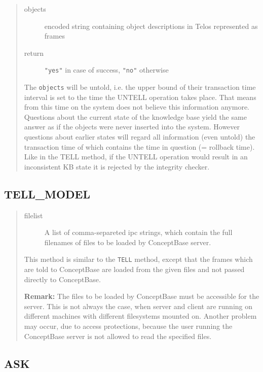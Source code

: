 \begin{quote}
\begin{description}
\item[objects] encoded string containing object descriptions in Telos represented as frames
\item[return] \verb+"yes"+ in case of success, \verb+"no"+ otherwise
\end{description}

The {\tt objects} will be untold, i.e. the upper bound of their
transaction time interval is set to the time the UNTELL operation
takes place. That means from this time on the system does not believe
this information anymore. Questions about the current state of the
knowledge base yield the same answer as if the objects were never
inserted into the system. However questions about earlier states will
regard all information (even untold) the transaction time of which
contains the time in question (= rollback time). Like in the TELL
method, if the UNTELL operation would result in an inconsistent KB
state it is rejected by the integrity checker.
\end{quote}

\subsection{TELL\_MODEL}


\begin{quote}
\begin{description}
\item[filelist] A list of comma-separeted ipc strings, which contain the full filenames of
files to be loaded by ConceptBase server.
\end{description}

This method is similar to the {\tt TELL} method, except that the frames which are
told to ConceptBase are loaded from the given files and not passed directly to ConceptBase.

{\bf Remark:} The files to be loaded by ConceptBase must be accessible for the server.
This is not always the case, when server and client are running on different machines
with different filesystems mounted on. Another problem may occur, due to access protections,
because the user running the ConceptBase server is not allowed to read the specified files.
\end{quote}

\subsection{ASK}

